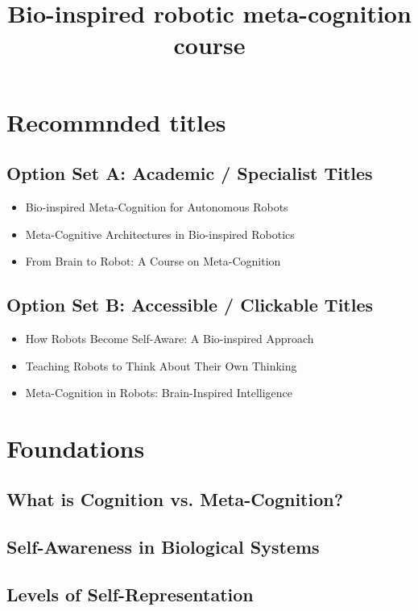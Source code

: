 \documentclass[a4paper]{article}
\title{Bio-inspired robotic meta-cognition course}
\date{}
\begin{document}
    \maketitle
    \section{Recommnded titles}
        \subsection{Option Set A: Academic / Specialist Titles}
            \begin{itemize}
                \item Bio-inspired Meta-Cognition for Autonomous Robots
                \item Meta-Cognitive Architectures in Bio-inspired Robotics
                \item From Brain to Robot: A Course on Meta-Cognition
            \end{itemize}
        
        
        \subsection{Option Set B: Accessible / Clickable Titles}
            \begin{itemize}
                \item How Robots Become Self-Aware: A Bio-inspired Approach
                \item Teaching Robots to Think About Their Own Thinking
                \item Meta-Cognition in Robots: Brain-Inspired Intelligence
            \end{itemize}
        
    \section{Foundations}

	\subsection{What is Cognition vs. Meta-Cognition?}
	\subsection{Self-Awareness in Biological Systems}
	\subsection{Levels of Self-Representation}
\end{document}
